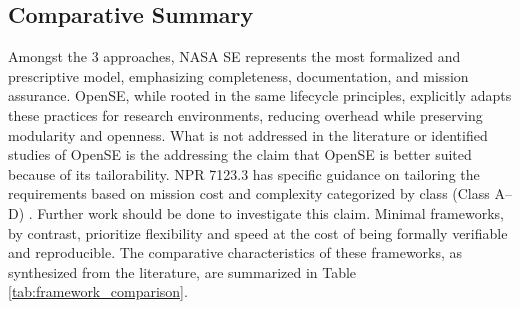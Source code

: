\subsection{Comparative Summary}
\label{sub:comparison}
Amongst the 3 approaches, NASA SE represents the most formalized and prescriptive model, emphasizing completeness, documentation, and mission assurance. 
OpenSE, while rooted in the same lifecycle principles, explicitly adapts these practices for research environments, reducing overhead while preserving modularity and openness. 
What is not addressed in the literature or identified studies of OpenSE is the addressing the claim that OpenSE is better suited because of its tailorability.
NPR 7123.3 has specific guidance on tailoring the requirements based on mission cost and complexity categorized by class (Class A–D) \cite{npr7123.1D}.
Further work should be done to investigate this claim.
Minimal frameworks, by contrast, prioritize flexibility and speed at the cost of being formally verifiable and reproducible. 
The comparative characteristics of these frameworks, as synthesized from the literature, are summarized in Table \ref{tab:framework_comparison}.

